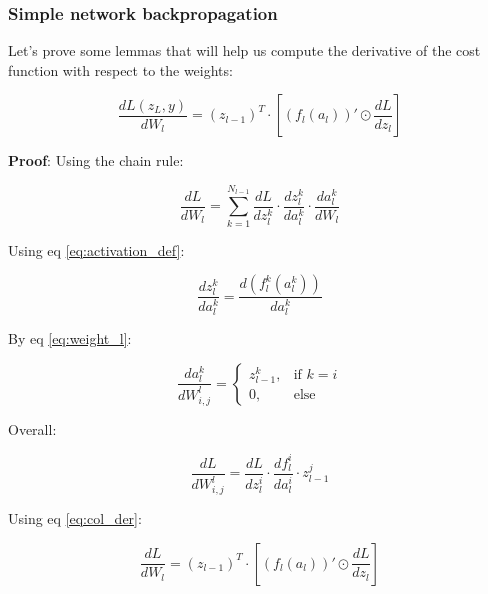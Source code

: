 \subsubsection*{Simple network backpropagation}

Let's prove some lemmas that will help us compute the derivative of the cost function with respect to the weights:

\begin{mdframed}[backgroundcolor=blue_background, linecolor=black, linewidth=2pt, frametitle=\textbf{Lemma}]
\begin{center}
\begin{equation} \label{lemma:simple_derivative}
    \frac{dL(z_L, y)}{dW_l} = (z_{l-1})^T \cdot [(f_l(a_l))' \odot \frac{dL}{dz_l}]
\end{equation}
\end{center}
\end{mdframed}

\textbf{Proof}:
Using the chain rule:

\begin{equation} \label{eq:BP-chain-rule}
    \frac{dL}{dW_l} = \sum_{k=1}^{N_{l-1}} \frac{dL}{dz_l^k} \cdot \frac{dz_l^k}{da_l^k} \cdot \frac{da_l^k}{dW_l}
\end{equation}

Using eq \ref{eq:activation_def}:

\begin{equation}
    \frac{dz_l^k}{da_l^k} = \frac{d(f_l^k(a_l^k))}{da_l^k}
\end{equation}

By eq \ref{eq:weight_l}:

\begin{equation}
    \frac{da_l^k}{dW_{i,j}^l} = \begin{cases} z_{l-1}^k, & \text{if } k=i \\ 0, & \text{else} \end{cases}
\end{equation}

Overall:

\begin{equation}
    \frac{dL}{dW_{i,j}^l} = \frac{dL}{dz_l^i} \cdot \frac{df_l^i}{da_l^i} \cdot z_{l-1}^j
\end{equation}

Using eq \ref{eq:col_der}:

\begin{equation}
    \frac{dL}{dW_l} = (z_{l-1})^T \cdot [(f_l(a_l))' \odot \frac{dL}{dz_l}]
\end{equation}


